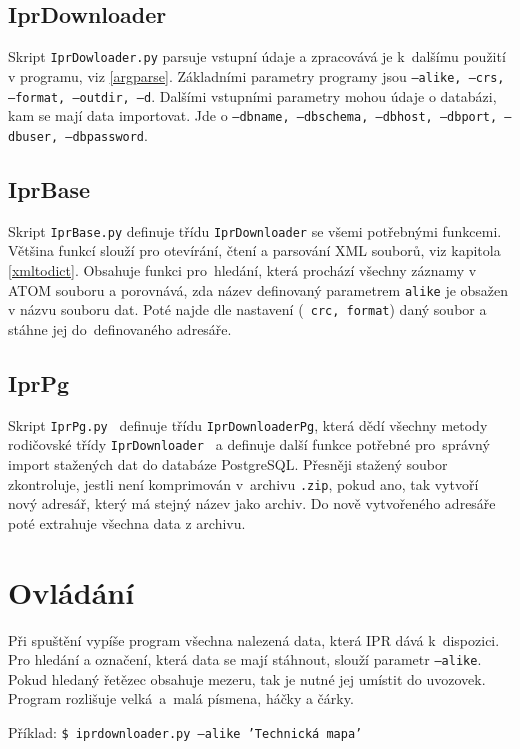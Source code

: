 \subsection{IprDownloader}
Skript {\tt IprDowloader.py} parsuje vstupní údaje a
zpracovává je k~dalšímu použití v programu, viz \ref{argparse}. Základními parametry programy jsou
{\tt ---alike, ---crs, ---format, ---outdir, ---d}.
Dalšími vstupními parametry mohou údaje o databázi, kam se mají data
importovat. Jde o 
{\tt ---dbname, ---dbschema, ---dbhost, ---dbport, ---dbuser, ---dbpassword}.


\subsection{IprBase}
Skript {\tt IprBase.py} definuje třídu {\tt IprDownloader} se všemi
potřebnými funkcemi. Většina funkcí slouží pro otevírání, čtení a
parsování XML souborů, viz kapitola \ref{xmltodict}. Obsahuje funkci
pro~hledání, která prochází všechny záznamy v ATOM souboru a porovnává, zda název
definovaný parametrem {\tt alike} je obsažen v názvu souboru dat. Poté najde dle nastavení ({\tt
  crc, format}) daný soubor a stáhne jej do~definovaného adresáře.


\subsection{IprPg}
Skript {\tt IprPg.py } definuje třídu {\tt IprDownloaderPg}, která
dědí všechny metody rodičovské třídy {\tt IprDownloader } a definuje další
funkce potřebné pro~správný import stažených dat do databáze
PostgreSQL. Přesněji stažený soubor zkontroluje, jestli není 
komprimován v~archivu {\tt *.zip}, pokud ano, tak vytvoří nový adresář,
který má stejný název jako archiv. Do nově vytvořeného adresáře poté 
extrahuje všechna data z archivu.


\section{Ovládání}
Při spuštění vypíše program všechna nalezená data,
která IPR dává k~dispozici. Pro hledání a označení, která data se mají
stáhnout, slouží parametr {\tt ---alike}. Pokud hledaný řetězec obsahuje mezeru,
tak je nutné jej umístit do uvozovek. Program rozlišuje velká~a~malá
písmena, háčky a čárky.

Příklad: {\tt \$ iprdownloader.py ---alike 'Technická mapa'}

